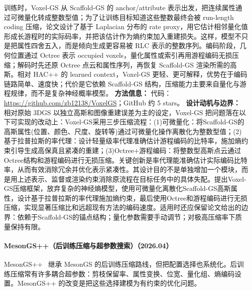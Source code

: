 训练时，Voxel-GS 从 Scaffold-GS 的 anchor/attribute 表示出发，把连续属性通过可微量化转成整数型值；为了让训练目标知道这些整数最终会被 run-length coding 压缩，论文设计了基于 Laplacian 分布的 rate proxy，用它估计相邻量化值形成长游程时的实际码率，并把该估计作为熵约束加入重建损失。这样，模型不只是把属性四舍五入，而是倾向生成更容易被 RLC 表示的整数序列。编码阶段，几何位置通过 Octree 表示 occupied voxels，量化属性或索引再用游程编码无损压缩；解码时先还原 Octree 点云和属性序列，再恢复 Scaffold-GS 渲染所需的高斯。相对 HAC++ 的 learned context，Voxel-GS 更轻、更可解释，优势在于编码链路简单、速度快；代价是它依赖 Scaffold-GS 结构，压缩能力主要来自量化与游程规律，而不是复杂神经概率模型。
\textbf{方法信息：} 代码：\url{https://github.com/zb12138/VoxelGS}；GitHub 约 5 stars。
\textbf{设计动机与边界：} 相对原始 3DGS 以独立高斯和图像重建误差为主的设定，Voxel-GS 把问题落在以下可实现的改动上：Voxel-GS采用三步压缩流程：(1)可微量化：将Scaffold-GS的高斯属性(位置、颜色、尺度、旋转等)通过可微量化操作离散化为整数型值；(2)基于拉普拉斯的率代理：设计轻量级率代理准确估计游程编码的比特率，施加熵约束引导生成高保真且紧凑的重建；(3)Octree+游程编码：将整数型高斯点云通过Octree结构和游程编码进行无损压缩。关键创新是率代理能准确估计实际编码比特率，从而有效消除冗余并优化表示紧凑性。其设计目的不是单独增加一个模块，而是用上述表示、监督或渲染约束消除原流程在目标任务中的具体失配。提出Voxel-GS压缩框架，放弃复杂的神经熵模型，使用可微量化离散化Scaffold-GS高斯属性，设计基于拉普拉斯的率代理施加熵约束，最后使用Octree和游程编码进行无损压缩，实现显著压缩比和远超现有方法的编码速度。适用时还应保留论文给出的边界：依赖于Scaffold-GS的锚点结构；量化参数需要手动调节；对极高压缩率下质量保持有限。
\paragraph{MesonGS++（后训练压缩与超参数搜索）（2026.04）}
MesonGS++~\cite{2604_26799} 继承 MesonGS 的后训练压缩路线，但把配置选择也系统化。后训练压缩常有许多耦合超参数：剪枝保留率、属性变换、位宽、量化组、熵编码设置。MesonGS++ 的改变是把这些选择建模为有约束的优化问题。

